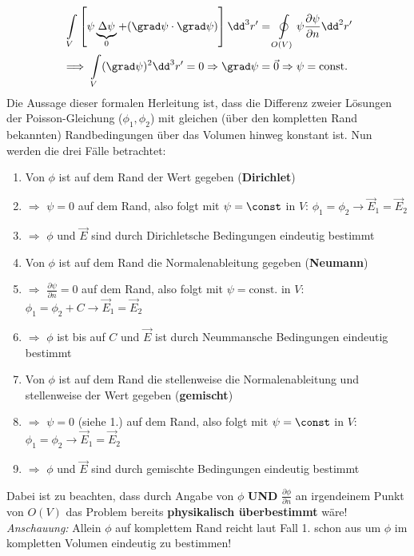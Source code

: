 		        \begin{equation}\label{psigln}\begin{split}
				        \int\limits_V \left[ \psi\underbrace{\Delta \psi}_{0} + (\grad
					        \psi\cdot \grad \psi) \right] \dd^3r' &=
				        \oint\limits_{O(V)} \psi\frac{\partial \psi}{\partial n}
				        \dd^2r'\\
				        \implies\int\limits_V (\grad
				        \psi)^2  \dd^3r' = 0 \Rightarrow \grad \psi &=
				        \vec{0} \Rightarrow \psi=\text{const.}
			        \end{split}\end{equation}
		        Die Aussage dieser formalen Herleitung ist, dass die Differenz zweier Lösungen der Poisson-Gleichung ($\phi_1,\phi_2$) mit gleichen (über den kompletten Rand bekannten) Randbedingungen über das Volumen hinweg konstant ist. Nun werden die drei Fälle betrachtet:
		        \begin{enumerate}
		        \item Von $\phi$ ist auf dem Rand der Wert gegeben (\textbf{Dirichlet})
		        \item[] $\Rightarrow$ $\psi=0$ auf dem
		        Rand, also folgt mit $\psi=\const$ in $V$: $
		        {\phi_1=\phi_2}\to
		        \vec{{E}}_{{1}} =\vec{{E}}_{{2}}$
		        \item[] $\Rightarrow$ $\phi$ und $\vec{E}$ sind durch Dirichletsche Bedingungen eindeutig bestimmt
		        \item Von $\phi$ ist auf dem Rand die Normalenableitung gegeben (\textbf{Neumann})
		        \item[]  $\Rightarrow$ $\frac{\partial\psi}{\partial n}=0$ auf dem
		        Rand, also folgt mit $\psi = \text{const.}$ in $V$: $\phi_1=\phi_2 +C\to
		        \vec{{E}}_{{1}}=\vec{{E}}_{{2}}$
		        \item[] $\Rightarrow$ $\phi$ ist bis auf $C$ und $\vec{E}$ ist durch Neummansche Bedingungen eindeutig bestimmt
		        \item Von $\phi$ ist auf dem Rand die stellenweise die Normalenableitung und stellenweise der Wert gegeben (\textbf{gemischt})
		        \item[] $\Rightarrow$ $\psi=0$ (siehe 1.) auf dem
		        Rand, also folgt mit $\psi=\const$ in $V$: $
		        {\phi_1=\phi_2}\to
		        \vec{{E}}_{{1}} =\vec{{E}}_{{2}}$
		        \item[] $\Rightarrow$ $\phi$ und $\vec{E}$ sind durch gemischte Bedingungen eindeutig bestimmt
		        \end{enumerate}
		    Dabei ist zu beachten, dass durch Angabe von $\phi$ \textbf{UND}
		        $\frac{\partial\phi}{\partial n}$ an irgendeinem
		        Punkt von $O(V)$ das Problem bereits
		        \textbf{physikalisch überbestimmt} wäre! \textit{Anschauung:} Allein $\phi$ auf komplettem Rand reicht laut Fall 1. schon aus um $\phi$ im kompletten Volumen eindeutig zu bestimmen!

